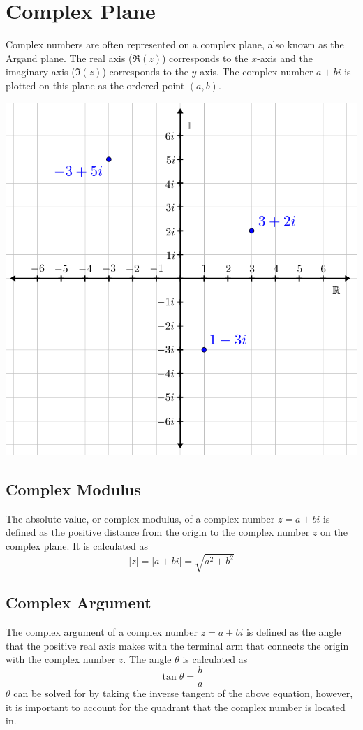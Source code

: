 \documentclass[12pt]{article}
\begin{document}
\section{Complex Plane}
Complex numbers are often represented on a complex plane, also known as the Argand plane. The real axis ($\Re(z)$) corresponds to the $x$-axis and the imaginary axis ($\Im(z)$) corresponds to the $y$-axis. The complex number $a + bi$ is plotted on this plane as the ordered point $(a, b)$.
\begin{center}
    \includegraphics[scale = 0.25]{Graphics/Week_12/ArgandPlane.png}
\end{center}

\subsection{Complex Modulus}
The absolute value, or complex modulus, of a complex number $z=a + bi$ is defined as the positive distance from the origin to the complex number $z$ on the complex plane. It is calculated as $$|z|=|a + bi| = \sqrt{a^2 + b^2}$$

\subsection{Complex Argument}
The complex argument of a complex number $z = a + bi$ is defined as the angle that the positive real axis makes with the terminal arm that connects the origin with the complex number $z$. The angle $\theta$ is calculated as $$\tan{\theta} = \frac{b}{a}$$ $\theta$ can be solved for by taking the inverse tangent of the above equation, however, it is important to account for the quadrant that the complex number is located in.
\end{document}
